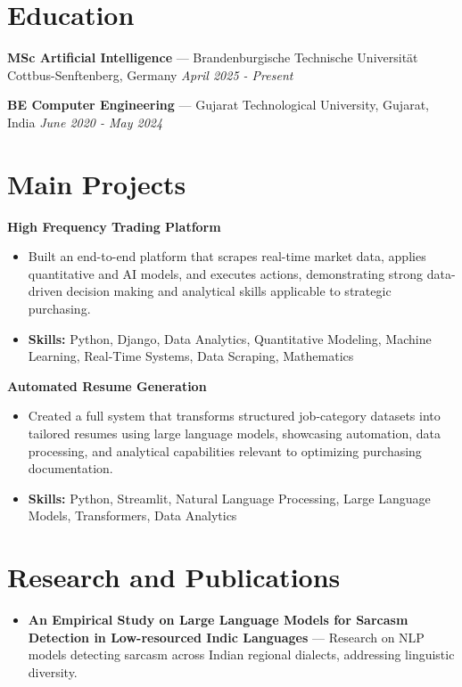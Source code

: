 \documentclass[a4paper,10pt]{article}
\begin{document}
\section*{Education}
\textbf{MSc Artificial Intelligence} — Brandenburgische Technische Universität Cottbus-Senftenberg, Germany \hfill \textit{April 2025 - Present}\par
\vspace{1.5pt}
\textbf{BE Computer Engineering} — Gujarat Technological University, Gujarat, India \hfill \textit{June 2020 - May 2024}\par

\section*{Main Projects}
\textbf{High Frequency Trading Platform}\par
\vspace{1pt}
\begin{itemize}
  \item Built an end-to-end platform that scrapes real-time market data, applies quantitative and AI models, and executes actions, demonstrating strong data-driven decision making and analytical skills applicable to strategic purchasing.
  \item \textbf{Skills:} Python, Django, Data Analytics, Quantitative Modeling, Machine Learning, Real-Time Systems, Data Scraping, Mathematics
\end{itemize}
\vspace{3pt}
\textbf{Automated Resume Generation}\par
\vspace{1pt}
\begin{itemize}
  \item Created a full system that transforms structured job-category datasets into tailored resumes using large language models, showcasing automation, data processing, and analytical capabilities relevant to optimizing purchasing documentation.
  \item \textbf{Skills:} Python, Streamlit, Natural Language Processing, Large Language Models, Transformers, Data Analytics
\end{itemize}

\section*{Research and Publications}
\begin{itemize}
\item \textbf{An Empirical Study on Large Language Models for Sarcasm Detection in Low-resourced Indic Languages} — Research on NLP models detecting sarcasm across Indian regional dialects, addressing linguistic diversity.
\end{itemize}
\end{document}

